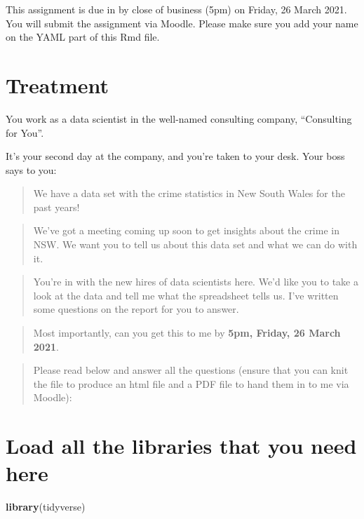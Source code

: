\documentclass[
]{article}
\newenvironment{Shaded}{\begin{snugshade}}{\end{snugshade}}
\newcommand{\KeywordTok}[1]{\textcolor[rgb]{0.13,0.29,0.53}{\textbf{#1}}}
\newcommand{\NormalTok}[1]{#1}
\begin{document}
This assignment is due in by close of business (5pm) on Friday, 26 March
2021. You will submit the assignment via Moodle. Please make sure you
add your name on the YAML part of this Rmd file.

\hypertarget{treatment}{%
\section{Treatment}\label{treatment}}

You work as a data scientist in the well-named consulting company,
``Consulting for You''.

It's your second day at the company, and you're taken to your desk. Your
boss says to you:

\begin{quote}
We have a data set with the crime statistics in New South Wales for the
past years!
\end{quote}

\begin{quote}
We've got a meeting coming up soon to get insights about the crime in
NSW. We want you to tell us about this data set and what we can do with
it.
\end{quote}

\begin{quote}
You're in with the new hires of data scientists here. We'd like you to
take a look at the data and tell me what the spreadsheet tells us. I've
written some questions on the report for you to answer.
\end{quote}

\begin{quote}
Most importantly, can you get this to me by \textbf{5pm, Friday, 26
March 2021}.
\end{quote}

\begin{quote}
Please read below and answer all the questions (ensure that you can knit
the file to produce an html file and a PDF file to hand them in to me
via Moodle):
\end{quote}

\hypertarget{load-all-the-libraries-that-you-need-here}{%
\section{Load all the libraries that you need
here}\label{load-all-the-libraries-that-you-need-here}}

\begin{Shaded}
\begin{Highlighting}[]
\KeywordTok{library}\NormalTok{(tidyverse)}
\end{Highlighting}
\end{Shaded}
\end{document}
